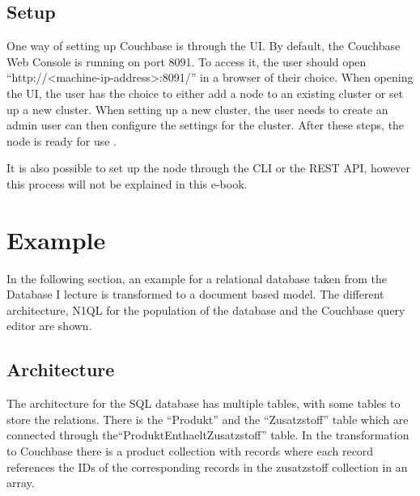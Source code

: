\subsection{Setup}
One way of setting up Couchbase is through the \ac{UI}. By default, the Couchbase Web Console is running on port 8091. To access it, the user should open ``http://<machine-ip-address>:8091/'' in a browser of their choice. When opening the \ac{UI}, the user has the choice to either add a node to an existing cluster or set up a new cluster. When setting up a new cluster, the user needs to create an admin user can then configure the settings for the cluster. After these steps, the node is ready for use \parencite{Couchbase.20230401}.

It is also possible to set up the node through the \ac{CLI} or the \ac{REST} \ac{API}, however this process will not be explained in this e-book.


\section{Example}

In the following section, an example for a relational database taken from the Database I lecture is transformed to a document based model. The different architecture, \ac{N1QL} for the population of the database and the Couchbase query editor are shown.

\subsection{Architecture}

The architecture for the \ac{SQL} database has multiple tables, with some tables to store the relations. There is the ``Produkt'' and the ``Zusatzstoff'' table which are connected through the``ProduktEnthaeltZusatzstoff'' table. In the transformation to Couchbase there is a product collection with records where each record references the IDs of the corresponding records in the zusatzstoff collection in an array.

